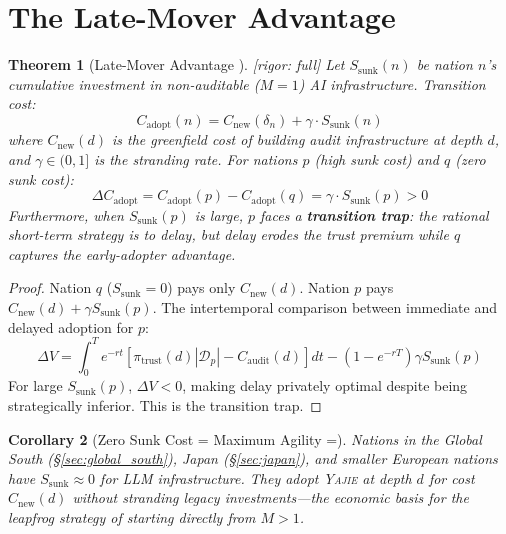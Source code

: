 \documentclass[11pt,a4paper]{article}
\newtheorem{theorem}{Theorem}[section]
\newtheorem{corollary}[theorem]{Corollary}
\theoremstyle{definition}
\theoremstyle{remark}
\newcommand{\rigorFull}{\textcolor{green!60!black}{[rigor: full]}}
\newcommand{\Yajie}{\textsc{Yajie}}
\newcommand{\cD}{\mathcal{D}}
\newcommand{\trustPremium}{\pi_{\text{trust}}}
\newcommand{\auditDepth}{\delta}
\newcommand{\MAone}{M=1}
\newcommand{\MAmany}{M>1}
\begin{document}
\section{The Late-Mover Advantage}
\label{sec:late_mover}
\begin{theorem}[Late-Mover Advantage ] \label{thm:late_mover}
\rigorFull
Let $S_{\text{sunk}}(n)$ be nation $n$'s cumulative investment in non-auditable ($\MAone$) AI infrastructure. Transition cost:
\begin{equation}
    C_{\text{adopt}}(n) = C_{\text{new}}(\auditDepth_n) + \gamma \cdot S_{\text{sunk}}(n)
    \label{eq:adoption_cost}
\end{equation}
where $C_{\text{new}}(d)$ is the greenfield cost of building audit infrastructure at depth $d$, and $\gamma \in (0,1]$ is the stranding rate. For nations $p$ (high sunk cost) and $q$ (zero sunk cost):
\begin{equation}
    \Delta C_{\text{adopt}} = C_{\text{adopt}}(p) - C_{\text{adopt}}(q) = \gamma \cdot S_{\text{sunk}}(p) > 0
    \label{eq:cost_advantage}
\end{equation}
Furthermore, when $S_{\text{sunk}}(p)$ is large, $p$ faces a \textbf{transition trap}: the rational short-term strategy is to delay, but delay erodes the trust premium while $q$ captures the early-adopter advantage.
\end{theorem}
\begin{proof}
Nation $q$ ($S_{\text{sunk}} = 0$) pays only $C_{\text{new}}(d)$. Nation $p$ pays $C_{\text{new}}(d) + \gamma S_{\text{sunk}}(p)$. The intertemporal comparison between immediate and delayed adoption for $p$:
\begin{equation}
    \Delta V = \int_0^T e^{-rt}[\trustPremium(d)|\cD_p| - C_{\text{audit}}(d)]dt - (1 - e^{-rT})\gamma S_{\text{sunk}}(p)
\end{equation}
For large $S_{\text{sunk}}(p)$, $\Delta V < 0$, making delay privately optimal despite being strategically inferior. This is the transition trap.
\end{proof}
\begin{corollary}[Zero Sunk Cost = Maximum Agility =]
Nations in the Global South (\S\ref{sec:global_south}), Japan (\S\ref{sec:japan}), and smaller European nations have $S_{\text{sunk}} \approx 0$ for LLM infrastructure. They adopt \Yajie{} at depth $d$ for cost $C_{\text{new}}(d)$ without stranding legacy investments---the economic basis for the leapfrog strategy of starting directly from $\MAmany$.
\end{corollary}
\end{document}
